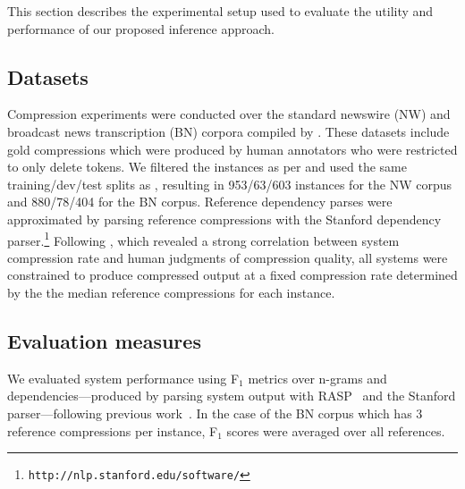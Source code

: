 \documentclass[11pt,a4paper]{article}
\begin{document}
This section describes the experimental setup used to evaluate the
utility and performance of our proposed inference approach.

\subsection{Datasets}
\label{data}
Compression experiments were conducted over the standard newswire (NW) and
broadcast news transcription (BN) corpora compiled by .
These datasets include gold compressions which were produced by human
annotators
who were restricted to only
delete tokens.
We filtered the instances as per  and used the
same training/dev/test splits as ,
resulting in 953/63/603 instances
for the NW corpus and 880/78/404 for the BN corpus.
Reference dependency parses were approximated by parsing reference
compressions with the Stanford dependency
parser.\footnote{\texttt{http://nlp.stanford.edu/software/}}
Following , which revealed a strong correlation between
system compression rate and human judgments of compression quality,
all systems were constrained to produce compressed output at a fixed
compression rate determined by the the median reference compressions
for each instance.

\subsection{Evaluation measures}
\label{measures}
We evaluated system performance using F$_1$ metrics over n-grams and
dependencies---produced by parsing
system output with
RASP~\cite{briscoe06} and the Stanford parser---following previous
work~\cite{unno06,clarke08,martins09a,napoles11a,thadani13a,thadani14}.
In the case of the BN corpus which has 3 reference compressions per instance,
F$_1$ scores were averaged over all references.
\end{document}
